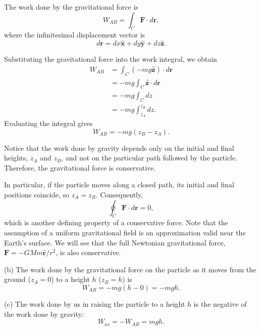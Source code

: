 \documentclass[../main.tex]{subfiles}
\begin{document}
The work done by the gravitational force is
\begin{equation}
    W_{AB} = \int_C \mathbf{F}\cdot d\mathbf{r},
\end{equation}
where the infinitesimal displacement vector is
\begin{equation}
    d\mathbf{r}
    = dx\hat{\mathbf{x}}
    + dy\hat{\mathbf{y}}
    + dz\hat{\mathbf{z}}.
\end{equation}

Substituting the gravitational force into the work integral,
we obtain
\begin{equation}
\begin{aligned}
    W_{AB}
    &= \int_C (-mg\hat{\mathbf{z}})\cdot d\mathbf{r} \\
    &= -mg\int_C \hat{\mathbf{z}}\cdot d\mathbf{r} \\
    &= -mg\int_C dz \\
    &= -mg\int_{z_A}^{z_B} dz.
\end{aligned}
\end{equation}
Evaluating the integral gives
\begin{equation}
    \boxed{W_{AB} = -mg(z_B-z_A).}
\end{equation}

Notice that the work done by gravity depends only on the
initial and final heights, $z_A$ and $z_B$, and not on the
particular path followed by the particle. Therefore, the
gravitational force is conservative.

In particular, if the particle moves along a closed path,
its initial and final positions coincide, so $z_A=z_B$.
Consequently,
\begin{equation}
    \boxed{\oint_C \mathbf{F}\cdot d\mathbf{r}=0,}
\end{equation}
which is another defining property of a conservative force. Note that the assumption of a uniform gravitational field is an approximation valid near the Earth's surface. We will see that the full Newtonian gravitational force,
$\mathbf{F}=-GMm\hat{\mathbf{r}}/r^2$, is also conservative.

(b) The work done by the gravitational force on the particle as it moves from the ground ($z_A=0$) to a height $h$ ($z_B=h$) is
\begin{equation}
    W_{AB} = -mg(h-0) = -mgh.
\end{equation}

(c) The work done by us in raising the particle to a height $h$ is the negative of the work done by gravity:
\begin{equation}
    W_{us} = -W_{AB} = mgh.
\end{equation}
\end{document}
